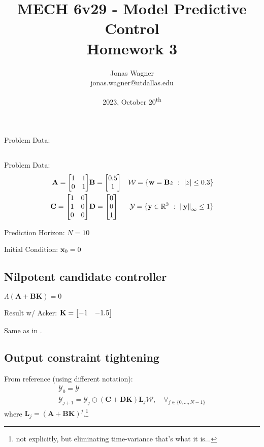 \documentclass[]{article}
\title{
    MECH 6v29 - Model Predictive Control\\ 
    Homework 3
}
\author{Jonas Wagner\\ jonas.wagner@utdallas.edu}
\date{2023, October 20\textsuperscript{th}}
\newcommand{\R}{\mathbb{R}}
\newcommand{\st}{\ : \ }
\begin{document}
\maketitle

\tableofcontents

\newpage
\section{}
Problem Data:

\subsection{}
Problem Data:
\begin{equation}
    \begin{aligned}
        \mathbf{A} = \mqty[1&1\\0&1] & \mathbf{B} = \mqty[0.5\\1] & \mathcal{W} = \{\vb{w} = \mathbf{B} z \st \abs{z} \leq 0.3\}\\
        \mathbf{C} = \mqty[1&0\\1&0\\0&0] & \mathbf{D} = \mqty[0\\0\\1] & \mathcal{Y} = \{\vb{y} \in \R^3 \st \norm{\vb{y}}_{\infty} \leq 1\}
    \end{aligned}
\end{equation}

Prediction Horizon:
$N = 10$

Initial Condition:
$\vb{x}_0 = 0$

\subsection{Nilpotent candidate controller}
$\Lambda(\mathbf{A+BK}) = 0$

Result w/ Acker:
$\vb{K} = \mqty[-1 & -1.5]$

Same as in \cite{}.


\subsection{Output constraint tightening}
From reference (using different notation):
\begin{equation}
    \begin{aligned}
        \mathcal{Y}_0 = \mathcal{Y}\\
        \mathcal{Y}_{j+1} = \mathcal{Y}_{j} \ominus (\mathbf{C + DK}) \mathbf{L}_{j} \mathcal{W}, \quad \forall_{j \in \{0,\dots,N-1\}}
    \end{aligned}
\end{equation}
where $\mathbf{L}_{j} = (\mathbf{A+BK})^{j}$.\footnote{not explicitly, but eliminating time-variance that's what it is...}
\end{document}
